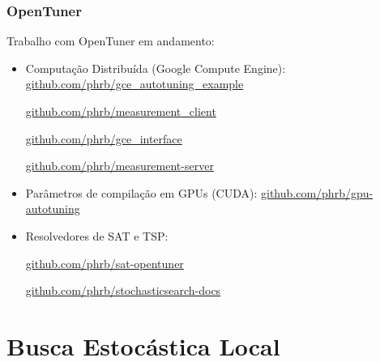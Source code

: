 \documentclass[10pt, compress]{beamer}
\begin{document}
\begin{frame}[fragile]
    \frametitle{OpenTuner}
    Trabalho com OpenTuner em andamento:
    \begin{itemize}
        \item Computação Distribuída (\alert{Google Compute Engine}):
            \url{github.com/phrb/gce\_autotuning\_example}

            \url{github.com/phrb/measurement\_client}

            \url{github.com/phrb/gce\_interface}

            \url{github.com/phrb/measurement-server}
            \pause
        \item Parâmetros de compilação em GPUs (\alert{CUDA}):
            \url{github.com/phrb/gpu-autotuning}
            \pause
        \item Resolvedores de \alert{SAT} e \alert{TSP}:

            \url{github.com/phrb/sat-opentuner}

            \url{github.com/phrb/stochasticsearch-docs}
    \end{itemize}
\end{frame}

\section{Busca Estocástica Local}
\end{document}
